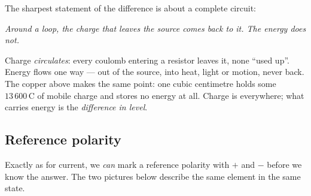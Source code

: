 \documentclass[11pt,a4paper]{article}
\newcommand{\uni}[1]{\,\mathrm{#1}}
\newcommand{\Cb}{\uni{C}}  \newcommand{\s}{\uni{s}}
\begin{document}
The sharpest statement of the difference is about a complete circuit:

\begin{center}
\begin{minipage}{0.88\textwidth}
\centering\itshape
Around a loop, the charge that leaves the source comes back to it. The energy does not.
\end{minipage}
\end{center}

Charge \emph{circulates}: every coulomb entering a resistor leaves it, none ``used up''.
Energy flows one way --- out of the source, into heat, light or motion, never back. The
copper above makes the same point: one cubic centimetre holds some $13\,600\Cb$ of mobile
charge and stores no energy at all. Charge is everywhere; what carries energy is the
\emph{difference in level}.


\subsection{Reference polarity}

Exactly as for current, we \emph{can} mark a reference polarity with $+$ and $-$ before we
know the answer. The two pictures below describe the same element in the same state.
\end{document}
